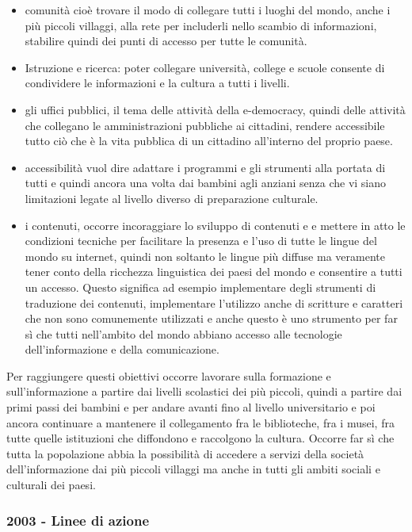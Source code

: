 \begin{itemize}
    \item comunità cioè trovare il modo di collegare tutti i luoghi del mondo, anche i più piccoli villaggi, alla rete per includerli nello scambio di informazioni, stabilire quindi dei punti di accesso per tutte le comunità.
    \item Istruzione e ricerca: poter collegare università, college e scuole consente di condividere le informazioni e la cultura a tutti i livelli.
    \item gli uffici pubblici, il tema delle attività della e-democracy, quindi delle attività che collegano le amministrazioni pubbliche ai cittadini, rendere accessibile tutto ciò che è la vita pubblica di un cittadino all'interno del proprio paese.
    \item accessibilità vuol dire adattare i programmi e gli strumenti alla portata di tutti e quindi ancora una volta dai bambini agli anziani senza che vi siano limitazioni legate al livello diverso di preparazione culturale.
    \item i contenuti, occorre incoraggiare lo sviluppo di contenuti e e mettere in atto le condizioni tecniche per facilitare la presenza e l'uso di tutte le lingue del mondo su internet, quindi non soltanto le lingue più diffuse ma veramente tener conto della ricchezza linguistica dei paesi del mondo e consentire a tutti un accesso. Questo significa ad esempio implementare degli strumenti di traduzione dei contenuti, implementare l'utilizzo anche di scritture e caratteri che non sono comunemente utilizzati e anche questo è uno strumento per far sì che tutti nell'ambito del mondo abbiano accesso alle tecnologie dell'informazione e della comunicazione.
\end{itemize}

Per raggiungere questi obiettivi occorre lavorare sulla formazione e sull'informazione a partire dai livelli scolastici dei più piccoli, quindi a partire dai primi passi dei bambini e per andare avanti fino al livello universitario e poi ancora continuare a mantenere il collegamento fra le biblioteche, fra i musei, fra tutte quelle istituzioni che diffondono e raccolgono la cultura.
Occorre far sì che tutta la popolazione abbia la possibilità di accedere a servizi della società dell'informazione dai più piccoli villaggi ma anche in tutti gli ambiti sociali e culturali dei paesi.

\subsubsection{2003 - Linee di azione}

